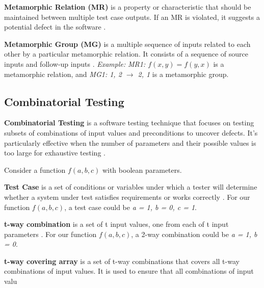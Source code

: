 \textbf{Metamorphic Relation (MR)} is a property or characteristic that should be maintained between multiple test case outputs. If an MR is violated, it suggests a potential defect in the software \cite{MetamorphicTestingReview}.

\textbf{Metamorphic Group (MG)} is a multiple sequence of inputs related to each other by a particular metamorphic relation. It consists of a sequence of source inputs and follow-up inputs \cite{MetamorphicTestingReview}. \textit{Example:} \textit{MR1: $f(x, y) = f(y, x)$} is a metamorphic relation, and \textit{MG1: {1, 2} $\rightarrow$ {2, 1}} is a metamorphic group.

\subsection{Combinatorial Testing}

\textbf{Combinatorial Testing} is a software testing technique that focuses on testing subsets of combinations of input values and preconditions to uncover defects. It's particularly effective when the number of parameters and their possible values is too large for exhaustive testing \cite{FELDERER20161}.

Consider a function $f(a, b, c)$ with boolean parameters.

\textbf{Test Case} is a set of conditions or variables under which a tester will determine whether a system under test satisfies requirements or works correctly \cite{comer}. For our function $f(a, b, c)$, a test case could be \textit{a = 1, b = 0, c = 1}.

\textbf{t-way combination} is a set of t input values, one from each of t input parameters \cite{comer}. For our function $f(a, b, c)$, a 2-way combination could be \textit{a = 1, b = 0}.

\textbf{t-way covering array} is a set of t-way combinations that covers all t-way combinations of input values. It is used to ensure that all combinations of input valu
